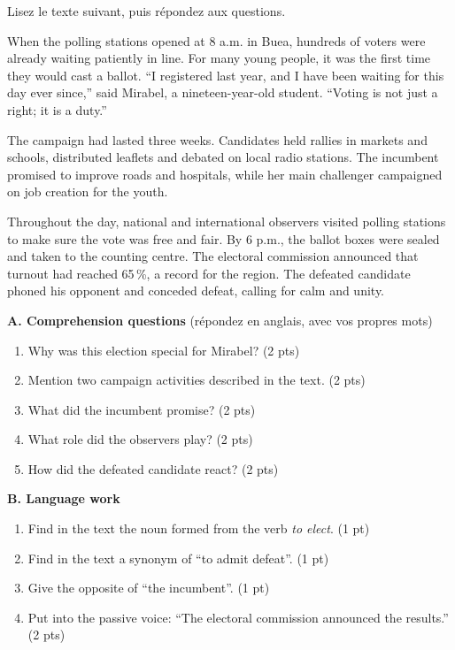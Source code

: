 \documentclass[11pt]{article}
\begin{document}
\begin{exercice}
Lisez le texte suivant, puis répondez aux questions.
\begin{textebox}
When the polling stations opened at 8 a.m. in Buea, hundreds of voters were already waiting patiently in line. For many young people, it was the first time they would cast a ballot. “I registered last year, and I have been waiting for this day ever since,” said Mirabel, a nineteen-year-old student. “Voting is not just a right; it is a duty.”

The campaign had lasted three weeks. Candidates held rallies in markets and schools, distributed leaflets and debated on local radio stations. The incumbent promised to improve roads and hospitals, while her main challenger campaigned on job creation for the youth.

Throughout the day, national and international observers visited polling stations to make sure the vote was free and fair. By 6 p.m., the ballot boxes were sealed and taken to the counting centre. The electoral commission announced that turnout had reached 65\,\%, a record for the region. The defeated candidate phoned his opponent and conceded defeat, calling for calm and unity.
\end{textebox}
\textbf{A. Comprehension questions} (répondez en anglais, avec vos propres mots)
\begin{enumerate}
\item Why was this election special for Mirabel? (2 pts)
\item Mention two campaign activities described in the text. (2 pts)
\item What did the incumbent promise? (2 pts)
\item What role did the observers play? (2 pts)
\item How did the defeated candidate react? (2 pts)
\end{enumerate}
\textbf{B. Language work}
\begin{enumerate}
\item Find in the text the noun formed from the verb \emph{to elect}. (1 pt)
\item Find in the text a synonym of “to admit defeat”. (1 pt)
\item Give the opposite of “the incumbent”. (1 pt)
\item Put into the passive voice: “The electoral commission announced the results.” (2 pts)
\end{enumerate}
\end{exercice}
\end{document}
